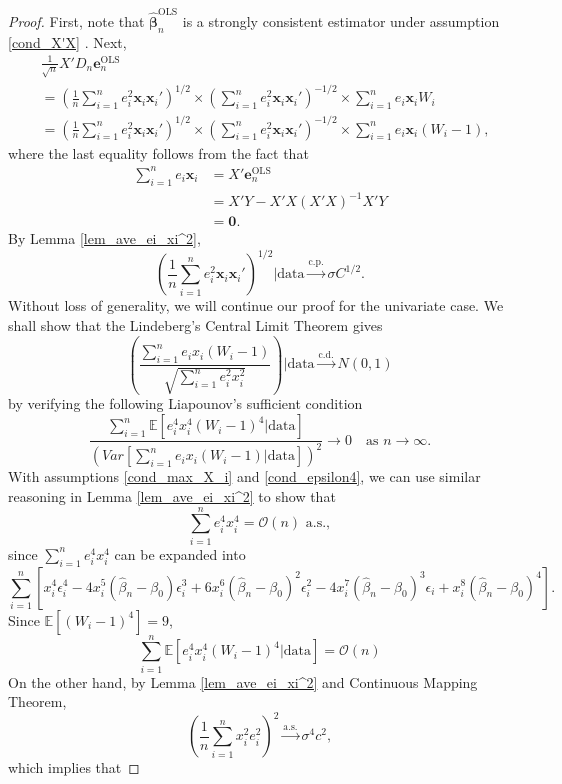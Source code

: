 \documentclass[12pt]{article}
\newcommand{\EX}{\mathbb{E}} %
\newcommand{\bLS}{\widehat{\bm{\beta}}_n^{\text{OLS}}} %
\newcommand{\eLS}{\bm{e}_n^{\text{OLS}}} %
\newcommand{\sumin}{\sum_{i=1}^n} %
\newcommand{\dn}{\frac{1}{n}} %
\newcommand{\dqn}{\frac{1}{\sqrt{n}}} %
\newcommand{\CONV}[1]{\stackrel{\text{#1}}{\longrightarrow}} %
\newcommand{\x}{\bm{x}_i} %
\begin{document}
\begin{proof}
	First, note that $\bLS$ is a strongly consistent estimator under assumption \eqref{cond_X'X} \citep*{LSEstrong}. Next,
	\begin{align*}
	&\dqn X' D_n \eLS \\
	&= \left( \dn \sumin e_i^2 \x \x' \right)^{1/2}
		\times \left( \sumin e_i^2 \x \x' \right)^{-1/2}
		\times \sumin e_i \x W_i \\ 
	&= \left( \dn \sumin e_i^2 \x \x' \right)^{1/2}
		\times \left( \sumin e_i^2 \x \x' \right)^{-1/2}
		\times \sumin e_i \x (W_i - 1), 
	\end{align*}
	where the last equality follows from the fact that
	\begin{align*}
	\sumin e_i \x
	&= X' \eLS \\
	&= X'Y - X'X (X'X)^{-1} X'Y \\
	&= \bm{0}.
	\end{align*}
	By Lemma \ref{lem_ave_ei_xi^2}, 
	$$
	\left( \dn \sumin e_i^2 \x \x' \right)^{1/2}
	\bigg| \text{data}
	\CONV{c.p.} 
	\sigma C^{1/2}.
	$$
	Without loss of generality, we will continue our proof for the univariate case. We shall show that the Lindeberg's Central Limit Theorem gives 
	$$
	\left(
		\dfrac{ \sumin e_i x_i (W_i - 1) }
			  { \sqrt{\sumin e_i^2 x_i^2} }
	\right) \bigg| \text{data}
	\CONV{c.d.} N(0, 1)
	$$
	by verifying the following Liapounov's sufficient condition
	$$
	\dfrac{ \sumin \EX 
					\left[ 
						e_i^4 x_i^4 
						(W_i - 1)^4 
						| \text{data}
					\right] 
		  }
		  { \left( Var 
		  			\left[
			  			\sumin e_i x_i (W_i - 1)
			  			| \text{data}
			  		\right] 
			\right)^2 
		  }
	\to 0 
	\quad \text{as} \,\,
	n \to \infty.
	$$
	With assumptions \eqref{cond_max_X_i} and \eqref{cond_epsilon4}, we can use similar reasoning in Lemma \ref{lem_ave_ei_xi^2} to show that 
	$$
	\sumin e_i^4 x_i^4 = \mathcal{O} (n) \,\, \text{a.s.},
	$$
	since $\sumin e_i^4 x_i^4$ can be expanded into
	$$
	\sumin \left[
				x_i^4 \epsilon_i^4 
				- 4 x_i^5 (\widehat{\beta}_n - \beta_0) \epsilon_i^3
				+ 6 x_i^6 (\widehat{\beta}_n - \beta_0)^2 \epsilon_i^2
				- 4 x_i^7 (\widehat{\beta}_n - \beta_0)^3 \epsilon_i
				+ x_i^8 (\widehat{\beta}_n - \beta_0)^4
			\right]. 
	$$ 
	Since $\EX \left[ (W_i - 1)^4 \right] = 9$, 
	$$
	\sumin \EX 
				\left[ 
					e_i^4 x_i^4 
					(W_i - 1)^4 
					| \text{data}
				\right]
			= \mathcal{O} (n)
	$$
	On the other hand, by Lemma \ref{lem_ave_ei_xi^2} and Continuous Mapping Theorem, 
	$$
	\left( \dn \sumin x_i^2 e_i^2 \right)^2
	\CONV{a.s.} 
	\sigma^4 c^2,
	$$
	which implies that

\end{proof}
\end{document}
